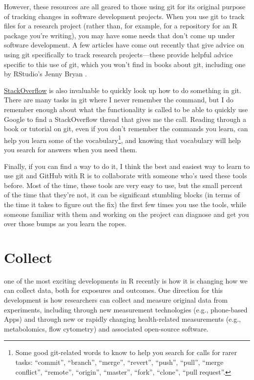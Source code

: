 \documentclass[]{tufte-book}
\begin{document}
However, these resources are all geared to those using git for its original purpose of
tracking changes in software development projects. When you use git to track files for a research
project (rather than, for example, for a repository for an R package you're writing), you
may have some needs that don't come up under software development. A few articles have come
out recently that give advice on using git specifically to track research projects---these provide
helpful advice specific to this use of git, which you won't find in books about git, including
one by RStudio's Jenny Bryan \citep{bryan2018excuse}.

\href{https://stackoverflow.com/}{StackOverflow}
is also invaluable to quickly look up how to do something in git. There are
many tasks in git where I never remember the command, but I do remember enough about what
the functionality is called to be able to quickly use Google to find a StackOverflow thread
that gives me the call. Reading through a book or tutorial on git, even if you don't
remember the commands you learn, can help you learn some of the vocabulary\footnote{Some good git-related
  words to know to help you search for calls for rarer tasks: ``commit'', ``branch'', ``merge'', ``revert'',
  ``push'', ``pull'', ``merge conflict'', ``remote'', ``origin'', ``master'', ``fork'', ``clone'', ``pull request''.},
and knowing that vocabulary will help you search for answers when you need them.

Finally, if you can find a way to do it, I think the best and easiest way to learn to use git
and GitHub with R is to collaborate with someone who's used these tools before. Most of the
time, these tools are very easy to use, but the small percent of the time that they're not,
it can be significant stumbling blocks (in terms of the time it takes to figure out the fix)
the first few times you use the tools, while someone familiar with them and working on the
project can diagnose and get you over those bumps as you learn the ropes.

\hypertarget{collect}{%
\chapter{Collect}\label{collect}}

 one of the most exciting
developments in R recently is how it is changing how we can collect data, both for
exposures and outcomes. One direction for this development is how researchers can
collect and measure original data from experiments, including through new measurement
technologies (e.g., phone-based Apps) and through new or rapidly changing health-related
measurements (e.g., metabolomics, flow cytometry) and associated open-source
software.
\end{document}
